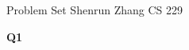 \documentclass{article}
\begin{document}
\large %
\linespread{1.5} %


{\Large Problem Set {}%
\hfill  Shenrun Zhang CS 229}

\vspace{0.5in}

%


{\large \bf Q1}\\
\end{document}
